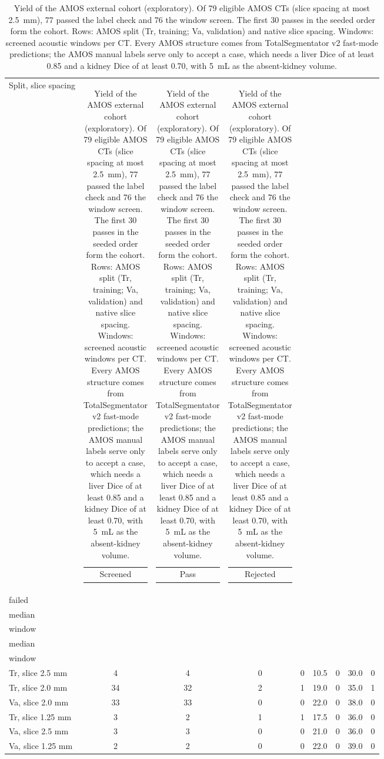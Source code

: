 
\begin{table}[tp]
\renewcommand{\baselinestretch}{1}\scriptsize
\caption{Yield of the AMOS external cohort (exploratory). Of 79 eligible AMOS CTs (slice spacing at most 2.5~mm), 77 passed the label check and 76 the window screen. The first 30 passes in the seeded order form the cohort. Rows: AMOS split (Tr, training; Va, validation) and native slice spacing. Windows: screened acoustic windows per CT. Every AMOS structure comes from TotalSegmentator v2 fast-mode predictions; the AMOS manual labels serve only to accept a case, which needs a liver Dice of at least 0.85 and a kidney Dice of at least 0.70, with 5~mL as the absent-kidney volume.}
\label{tab:amos-yield}
\centering
\setlength{\tabcolsep}{3pt}
\begin{tabularx}{\textwidth}{@{}l c c c c c c c c @{}}
\toprule
Split, slice spacing & \begin{tabular}[b]{@{}c@{}}Screened\end{tabular} & \begin{tabular}[b]{@{}c@{}}Pass\end{tabular} & \begin{tabular}[b]{@{}c@{}}Rejected\end{tabular} & \begin{tabular}[b]{@{}c@{}}Label check\\failed\end{tabular} & \begin{tabular}[b]{@{}c@{}}Liver windows,\\median\end{tabular} & \begin{tabular}[b]{@{}c@{}}No liver\\window\end{tabular} & \begin{tabular}[b]{@{}c@{}}Kidney windows,\\median\end{tabular} & \begin{tabular}[b]{@{}c@{}}No kidney\\window\end{tabular} \\
\midrule
Tr, slice 2.5 mm & 4 & 4 & 0 & 0 & 10.5 & 0 & 30.0 & 0 \\
Tr, slice 2.0 mm & 34 & 32 & 2 & 1 & 19.0 & 0 & 35.0 & 1 \\
Va, slice 2.0 mm & 33 & 33 & 0 & 0 & 22.0 & 0 & 38.0 & 0 \\
Tr, slice 1.25 mm & 3 & 2 & 1 & 1 & 17.5 & 0 & 36.0 & 0 \\
Va, slice 2.5 mm & 3 & 3 & 0 & 0 & 21.0 & 0 & 36.0 & 0 \\
Va, slice 1.25 mm & 2 & 2 & 0 & 0 & 22.0 & 0 & 39.0 & 0 \\
\bottomrule
\end{tabularx}
\end{table}
